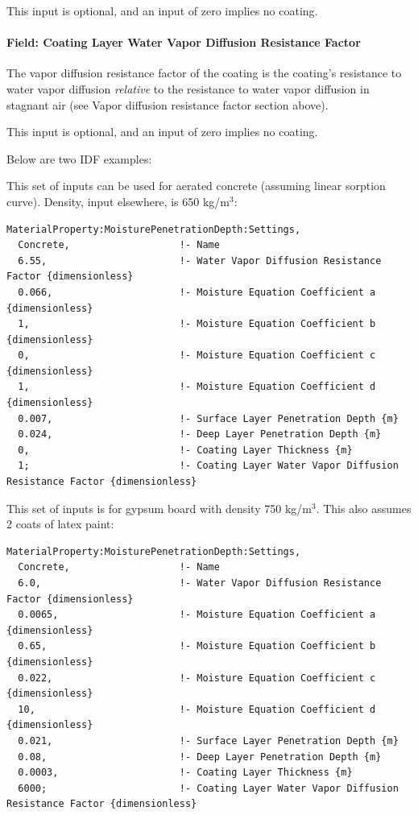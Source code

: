 This input is optional, and an input of zero implies no coating.

\paragraph{Field: Coating Layer Water Vapor Diffusion Resistance Factor}\label{field-coating-layer-water-vapor-diffusion-resistance-factor}

The vapor diffusion resistance factor of the coating is the coating's resistance to water vapor diffusion \emph{relative} to the resistance to water vapor diffusion in stagnant air (see Vapor diffusion resistance factor section above).

This input is optional, and an input of zero implies no coating.

Below are two IDF examples:

This set of inputs can be used for aerated concrete (assuming linear sorption curve). Density, input elsewhere, is 650 kg/m$^3$:

\begin{lstlisting}
MaterialProperty:MoisturePenetrationDepth:Settings,
  Concrete,                   !- Name
  6.55,                       !- Water Vapor Diffusion Resistance Factor {dimensionless}
  0.066,                      !- Moisture Equation Coefficient a {dimensionless}
  1,                          !- Moisture Equation Coefficient b {dimensionless}
  0,                          !- Moisture Equation Coefficient c {dimensionless}
  1,                          !- Moisture Equation Coefficient d {dimensionless}
  0.007,                      !- Surface Layer Penetration Depth {m}
  0.024,                      !- Deep Layer Penetration Depth {m}
  0,                          !- Coating Layer Thickness {m}
  1;                          !- Coating Layer Water Vapor Diffusion Resistance Factor {dimensionless}
\end{lstlisting}

This set of inputs is for gypsum board with density 750 kg/m$^3$. This also assumes 2 coats of latex paint:

\begin{lstlisting}
MaterialProperty:MoisturePenetrationDepth:Settings,
  Concrete,                   !- Name
  6.0,                        !- Water Vapor Diffusion Resistance Factor {dimensionless}
  0.0065,                     !- Moisture Equation Coefficient a {dimensionless}
  0.65,                       !- Moisture Equation Coefficient b {dimensionless}
  0.022,                      !- Moisture Equation Coefficient c {dimensionless}
  10,                         !- Moisture Equation Coefficient d {dimensionless}
  0.021,                      !- Surface Layer Penetration Depth {m}
  0.08,                       !- Deep Layer Penetration Depth {m}
  0.0003,                     !- Coating Layer Thickness {m}
  6000;                       !- Coating Layer Water Vapor Diffusion Resistance Factor {dimensionless}
\end{lstlisting}


